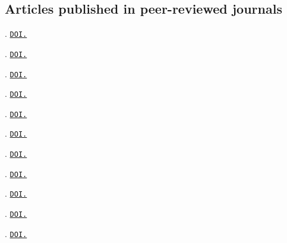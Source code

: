 \subsection{Articles published in peer-reviewed journals}
\begin{etaremune}[leftmargin=2.75cm,itemsep=2pt]

\item {}. \href{https://doi.org/10.1016/j.crsust.2025.100295}{\texttt{DOI.}}
\item {}. \href{https://www.doi.org/10.1016/j.erss.2024.103819}{\texttt{DOI.}}
\item {}. \href{https://www.doi.org/10.1371/journal.pclm.0000132}{\texttt{DOI.}} 
\item {}. \href{https://www.doi.org/10.1016/j.trd.2023.103626}{\texttt{DOI.}} 
\item {}. \href{https://www.doi.org/10.1080/01441647.2021.2023693}{\texttt{DOI.}} 
\item  {}. \href{https://www.doi.org/10.1016/j.enpol.2022.113047}{\texttt{DOI.}} 
\item {}. \href{https://www.doi.org/10.1016/j.tra.2022.03.025}{\texttt{DOI.}} 
\item {}. \href{https://www.doi.org/10.1016/j.jclepro.2022.131774}{\texttt{DOI.}} 
\item {}. \href{https://www.doi.org/10.1088/1748-9326/ac3531}{\texttt{DOI.}}
\item {}. \href{https://www.doi.org/10.1016/j.trd.2020.102615}{\texttt{DOI.}} 
\item {}. \href{https://www.doi.org/10.1088/1748-9326/ab90a5}{\texttt{DOI.}} 
\end{etaremune}



